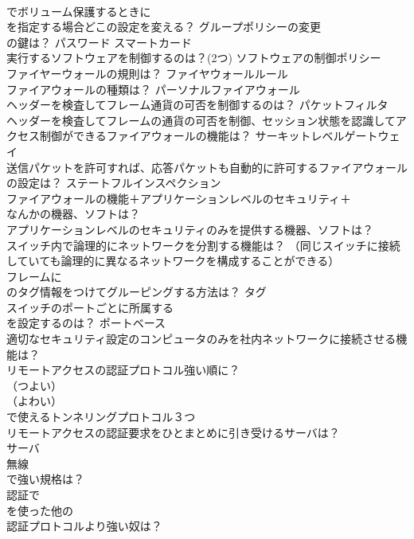 \documentclass[8pt]{extreport}
\begin{document}
\begin{CJK}{UTF8}{min}
\\	でボリューム保護するときに
\\	を指定する場合どこの設定を変える？	グループポリシーの変更
\\	の鍵は？	パスワード スマートカード
\\	実行するソフトウェアを制御するのは？(2つ)	ソフトウェアの制御ポリシー 
\\	ファイヤーウォールの規則は？	ファイヤウォールルール
\\	ファイアウォールの種類は？	パーソナルファイアウォール
\\	ヘッダーを検査してフレーム通貨の可否を制御するのは？	パケットフィルタ
\\	ヘッダーを検査してフレームの通貨の可否を制御、セッション状態を認識してアクセス制御ができるファイアウォールの機能は？	サーキットレベルゲートウェイ
\\	送信パケットを許可すれば、応答パケットも自動的に許可するファイアウォールの設定は？	ステートフルインスペクション
\\	ファイアウォールの機能＋アプリケーションレベルのセキュリティ＋
\\	なんかの機器、ソフトは？	
\\	アプリケーションレベルのセキュリティのみを提供する機器、ソフトは？	
\\	スイッチ内で論理的にネットワークを分割する機能は？ （同じスイッチに接続していても論理的に異なるネットワークを構成することができる）	
\\	フレームに
\\	のタグ情報をつけてグルーピングする方法は？	タグ
\\	スイッチのポートごとに所属する
\\	を設定するのは？	ポートベース
\\	適切なセキュリティ設定のコンピュータのみを社内ネットワークに接続させる機能は？	
\\	リモートアクセスの認証プロトコル強い順に？ 
\\	（つよい） 
\\	（よわい）
\\	で使えるトンネリングプロトコル３つ	
\\	リモートアクセスの認証要求をひとまとめに引き受けるサーバは？	
\\	サーバ
\\	無線
\\	で強い規格は？	
\\	認証で
\\	を使った他の
\\	認証プロトコルより強い奴は？	

\end{CJK}
\end{document}
